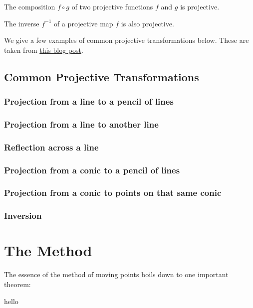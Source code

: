 \documentclass{article}
\theoremstyle{mytheoremstyle}
\theoremstyle{mytheoremstyle}
\theoremstyle{myproblemstyle}
\begin{document}
    \begin{theorem}
        The composition $f \circ g$ of two projective functions $f$ and $g$ is projective.
    \end{theorem}

    \begin{theorem}
        The inverse $f^{-1}$ of a projective map $f$ is also projective.
    \end{theorem}

    

    We give a few examples of common projective transformations below. These are taken from \href{https://artofproblemsolving.com/community/c473124h1763266_moving_points_tutorial}{this blog post}.


    \subsection{Common Projective Transformations}
    \subsubsection{Projection from a line to a pencil of lines}
    \subsubsection{Projection from a line to another line}
    \subsubsection{Reflection across a line}
    \subsubsection{Projection from a conic to a pencil of lines}
    \subsubsection{Projection from a conic to points on that same conic}
    \subsubsection{Inversion}

    \section{The Method}
    The essence of the method of moving points boils down to one important theorem:
    \begin{theorem}
        hello
    \end{theorem}

    
\end{document}
